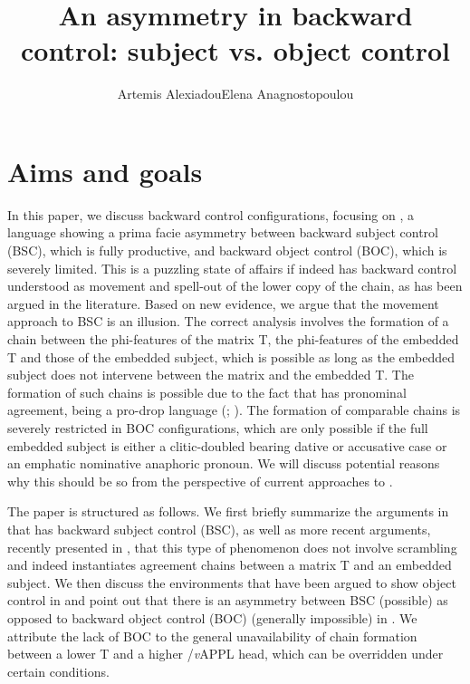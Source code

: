 \documentclass[output=paper]{langsci/langscibook}
\author{Artemis Alexiadou\affiliation{Humboldt-Universität zu Berlin\\Leibniz-Zentrum Allgemeine Sprachwissenschaft, Berlin}\lastand Elena Anagnostopoulou\affiliation{University of Crete}}
\title{An asymmetry in backward control: subject vs. object control}
\begin{document}
\citereset

 

\section{Aims and goals}

In this paper, we discuss backward control configurations, focusing on , a language showing a prima facie asymmetry between backward subject control (BSC), which is fully productive, and backward object control (BOC), which is severely limited. This is a puzzling state of affairs if  indeed has backward control understood as movement and spell-out of the lower copy of the chain, as has been argued in the literature. Based on new evidence, we argue that the movement approach to  BSC is an illusion. The correct analysis involves the formation of a chain between the phi-features of the matrix T, the phi-features of the embedded T and those of the embedded subject, which is possible as long as the embedded subject does not intervene between the matrix and the embedded T. The formation of such chains is possible due to the fact that  has pronominal agreement, being a pro-drop language (\citealt{Alexiadou1998}; \citealt{Barbosa2009}). The formation of comparable chains is severely restricted in BOC configurations, which are only possible if the full embedded subject is either a clitic-doubled  bearing dative or accusative case or an emphatic nominative anaphoric pronoun. We will discuss potential reasons why this should be so from the perspective of current approaches to .

The paper is structured as follows. We first briefly summarize the arguments in \citet{Alexiadou2010} that  has backward subject control (BSC), as well as more recent arguments, recently presented in \citet{Tsakali2017}, that this type of phenomenon does not involve scrambling and indeed instantiates agreement chains between a matrix T and an embedded subject. We then discuss the environments that have been argued to show object control in  and point out that there is an asymmetry between BSC (possible) as opposed to backward object control (BOC) (generally impossible) in . We attribute the lack of BOC to the general unavailability of chain formation between a lower T and a higher \slash \textit{v}APPL head, which can be overridden under certain conditions.
\end{document}
